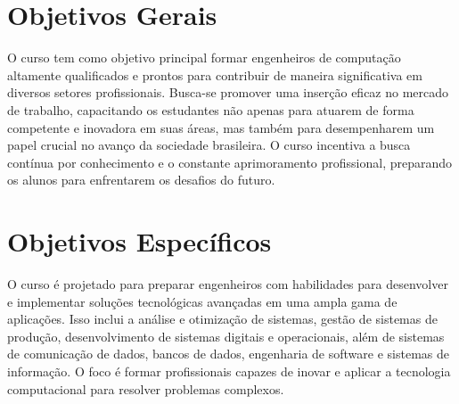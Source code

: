 \section{Objetivos Gerais}
O curso tem como objetivo principal formar engenheiros de computação altamente qualificados e prontos para contribuir de maneira significativa em diversos setores profissionais. Busca-se promover uma inserção eficaz no mercado de trabalho, capacitando os estudantes não apenas para atuarem de forma competente e inovadora em suas áreas, mas também para desempenharem um papel crucial no avanço da sociedade brasileira. O curso incentiva a busca contínua por conhecimento e o constante aprimoramento profissional, preparando os alunos para enfrentarem os desafios do futuro.

\section{Objetivos Específicos}
O curso é projetado para preparar engenheiros com habilidades para desenvolver e implementar soluções tecnológicas avançadas em uma ampla gama de aplicações. Isso inclui a análise e otimização de sistemas, gestão de sistemas de produção, desenvolvimento de sistemas digitais e operacionais, além de sistemas de comunicação de dados, bancos de dados, engenharia de software e sistemas de informação. O foco é formar profissionais capazes de inovar e aplicar a tecnologia computacional para resolver problemas complexos.